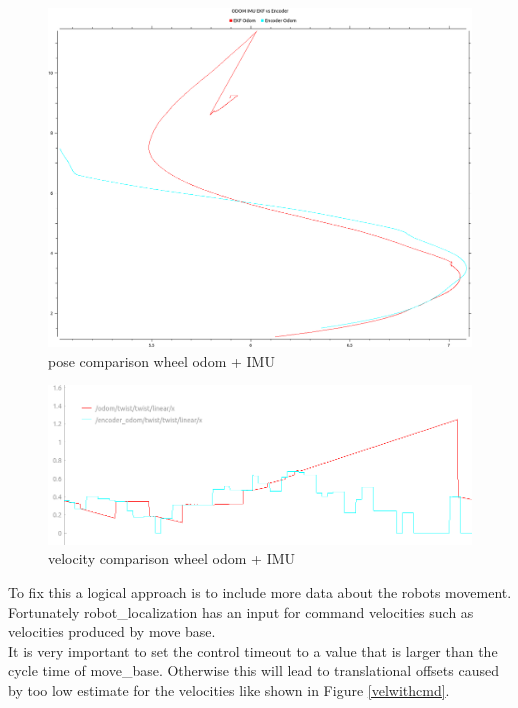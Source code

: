 \begin{figure}
	\includegraphics[width=\textwidth]{Pictures/odom pose comp}
	\caption{pose comparison wheel odom + IMU}
	\label{pose comparison wheel odom + IMU}

\end{figure}

\begin{figure}
	\includegraphics[width=\textwidth]{Pictures/comparison odom}
	\caption{velocity comparison wheel odom + IMU}
	\label{velocity comparison wheel odom + IMU}

\end{figure}


To fix this a logical approach is to include more data about the robots movement. Fortunately robot\_localization has an input for command velocities such as velocities produced by move base.\\
It is very important to set the control timeout to a value that is larger than the cycle time of move\_base. Otherwise this will lead to translational offsets caused by too low estimate for the velocities like shown in Figure \ref{velwithcmd}.

